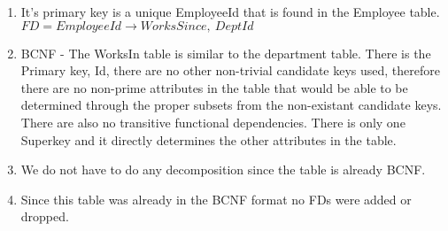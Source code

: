 \documentclass{article}
\begin{document}
  \begin{enumerate}[label=\roman*]
  	\item It's primary key is a unique EmployeeId that is found in the Employee table. \newline
    $FD = EmployeeId \rightarrow WorksSince,\ DeptId$
  	\item BCNF - The WorksIn table is similar to the department table. There is the Primary key, Id, there are no other non-trivial candidate keys used, therefore there are no non-prime attributes in the table that would be able to be determined through the proper subsets from the non-existant candidate keys. There are also no transitive functional dependencies. There is only one Superkey and it directly determines the other attributes in the table.
  	\item We do not have to do any decomposition since the table is already BCNF.
  	\item Since this table was already in the BCNF format no FDs were added or dropped.
  \end{enumerate}
\end{document}
